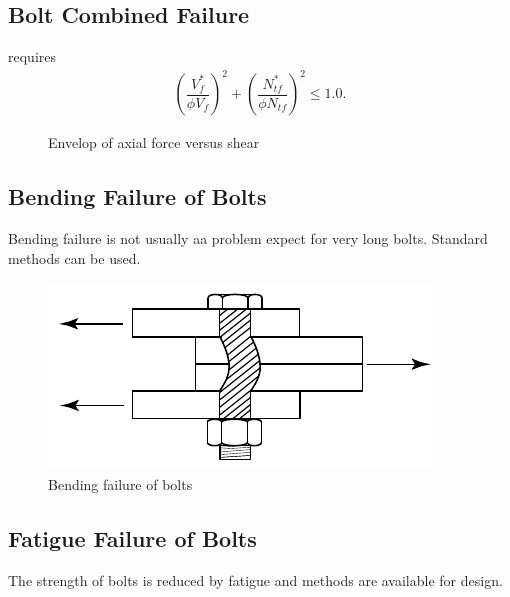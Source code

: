 \subsection{Bolt Combined Failure}\label{sec:bolt_combined}
 requires
\begin{gather}
\left(\dfrac{V^*_{f}}{\phi{}V_{f}}\right)^2+\left(\dfrac{N^*_{tf}}{\phi{}N_{tf}}\right)^2\leqslant1.0.
\end{gather}
\begin{figure}[H]
\centering\caption{Envelop of axial force versus shear}
\end{figure}
\subsection{Bending Failure of Bolts}
Bending failure is not usually aa problem expect for very long bolts. Standard methods can be used.
\begin{figure}[H]
\centering
\includegraphics{PIC/CH06/BBF}\caption{Bending failure of bolts}
\end{figure}
\subsection{Fatigue Failure of Bolts}
The strength of bolts is reduced by fatigue and methods are available for design.

